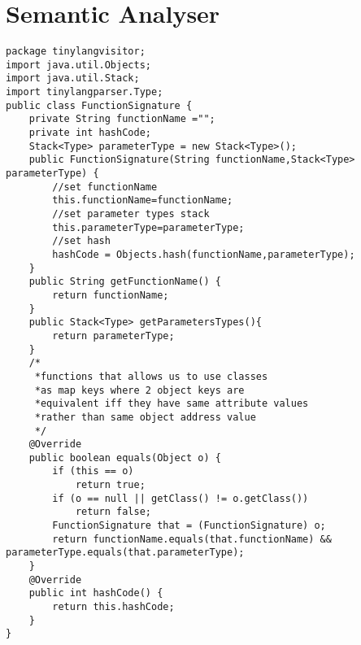 \section{Semantic Analyser}
\begin{lstlisting}[basicstyle=\miniscule,caption=Function Signature,label=listing:functionsignature]
package tinylangvisitor;
import java.util.Objects;
import java.util.Stack;
import tinylangparser.Type;
public class FunctionSignature {
	private String functionName ="";
	private int hashCode;
	Stack<Type> parameterType = new Stack<Type>();
	public FunctionSignature(String functionName,Stack<Type> parameterType) {
		//set functionName
		this.functionName=functionName;
		//set parameter types stack
		this.parameterType=parameterType;
		//set hash
		hashCode = Objects.hash(functionName,parameterType);
	}
    public String getFunctionName() {
    	return functionName;
    }
    public Stack<Type> getParametersTypes(){
    	return parameterType;
    }
	/*
	 *functions that allows us to use classes 
     *as map keys where 2 object keys are 
     *equivalent iff they have same attribute values
     *rather than same object address value
     */
    @Override
    public boolean equals(Object o) {
        if (this == o)
            return true;
        if (o == null || getClass() != o.getClass())
            return false;
        FunctionSignature that = (FunctionSignature) o;
        return functionName.equals(that.functionName) && parameterType.equals(that.parameterType);
    }
    @Override
    public int hashCode() {
        return this.hashCode;
    }
}
\end{lstlisting}
